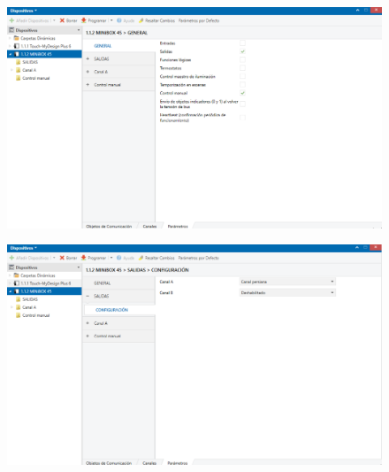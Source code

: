 \documentclass[10pt]{article}
\begin{document}
\begin{figure}[H]
	\begin{center}
	 		\includegraphics[width = 1.00\textwidth]{Imagenes/img38}
	\end{center} 
\end{figure}

\begin{figure}[H]
	\begin{center}
	 		\includegraphics[width = 1.00\textwidth]{Imagenes/img39}
	\end{center} 
\end{figure}
\end{document}
